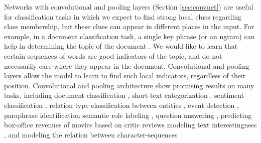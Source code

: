 \documentclass[jair,twoside,11pt,theapa]{article}
\begin{document}
Networks with convolutional and pooling layers (Section \ref{sec:convnet}) are useful for classification tasks in which
we expect to find strong local clues regarding class membership, but these clues
can appear in different places in the input. For example, in a document
classification task, a single key phrase (or an ngram) can help in determining the
topic of the document \cite{johnson2015effective}.  We would like to learn that certain sequences of words
are good indicators of the topic, and do not necessarily care where they appear
in the document.  Convolutional and pooling layers allow the model to learn to
find such local indicators, regardless of their position.  Convolutional and
pooling architecture show promising results on many tasks, including document classification
\cite{johnson2015effective}, short-text categorization \cite{wang2015semantic},
sentiment classification \cite{kalchbrenner2014convolutional,kim2014convolutional},
relation type classification between entities
\cite{zeng2014relation,dossantos2015classifying}, event detection
\cite{chen2015event,nguyen2015event}, paraphrase identification \cite{yin2015convolutional}
semantic role labeling \cite{collobert2011natural}, question answering
\cite{dong2015question}, predicting box-office revenues of movies based on
critic reviews \cite{bitvai2015nonlinear} modeling text interestingness
\cite{gao2014modeling}, and modeling the relation between character-sequences
\end{document}

